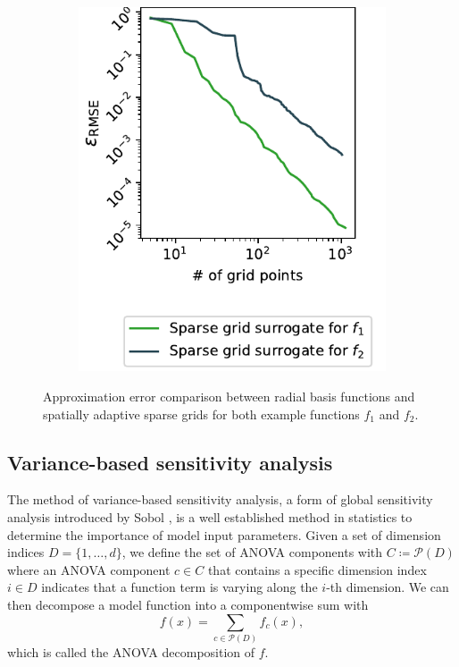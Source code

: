 \documentclass[
  a4paper,  %
  twoside,  %
  bibliography=totoc,
  headsepline,
  cleardoublepage=empty,
  parskip=half,
  draft=false
]{scrbook}
\begin{document}
\begin{mdframed}[style=style]
\begin{figure}[H]
\begin{subfigure}{.5\textwidth}
  \includegraphics[width=\linewidth]{graphics/grid_approx_f2}
  \label{fig:grid_approx_f2}
\vspace{2.5mm}
\end{subfigure}
  \delimit
\caption{
Approximation error comparison between radial basis functions and spatially adaptive sparse grids for both example functions $f_1$ and $f_2$.}
  \label{fig:dim_reduction_errors}
\end{figure}
\end{mdframed}

\subsection{Variance-based sensitivity analysis}

The method of variance-based sensitivity analysis, a form of global sensitivity analysis introduced by Sobol \cite{S01}, is a well established method in statistics to determine the importance of model input parameters.
Given a set of dimension indices $D=\{1,\dots,d\}$, we define the set of ANOVA components with $C \coloneqq \mathcal{P}(D)$ where an ANOVA component $c \in C$ that contains a specific dimension index $i \in D$ indicates that a function term is varying along the $i$-th dimension.
We can then decompose a model function into a componentwise sum with
\begin{equation}
f(x)=\sum_{c \in \mathcal{P}(D)} f_{c}(x),
\label{anovaComp}
\end{equation}
which is called the ANOVA decomposition of $f$.
\end{document}

